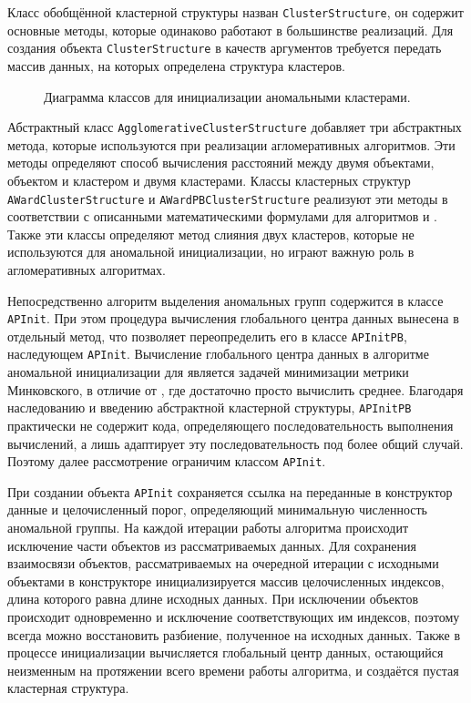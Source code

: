 \documentclass[12pt]{diploma}
\begin{document}
	Класс обобщённой кластерной структуры назван \texttt{ClusterStructure}, он содержит основные методы, которые одинаково работают в большинстве реализаций. Для создания объекта \texttt{ClusterStructure} в качеств аргументов требуется передать массив данных, на которых определена структура кластеров.
	
	\begin{figure}[h!]
		\centering
		
		\caption{Диаграмма классов для инициализации аномальными кластерами.}
		\label{fig:ap-init-classes}
	\end{figure}
	
	Абстрактный класс \texttt{AgglomerativeClusterStructure} добавляет три абстрактных метода, которые используются при реализации агломеративных алгоритмов. Эти методы определяют способ вычисления расстояний между двумя объектами, объектом и кластером и двумя кластерами.	Классы кластерных структур \texttt{AWardClusterStructure} и \texttt{AWardPBClusterStructure} реализуют эти методы в соответствии с описанными математическими формулами для алгоритмов \AWard и \AWardpb. Также эти классы определяют метод слияния двух кластеров, которые не используются для аномальной инициализации, но играют важную роль в агломеративных алгоритмах.
	
	Непосредственно алгоритм выделения аномальных групп содержится в классе \texttt{APInit}. При этом процедура вычисления глобального центра данных вынесена в отдельный метод, что позволяет переопределить его в классе \texttt{APInitPB}, наследующем \texttt{APInit}. Вычисление глобального центра данных в алгоритме аномальной инициализации для \AWardpb является задачей минимизации метрики Минковского, в отличие от  \AWard, где достаточно просто вычислить среднее. Благодаря наследованию и введению абстрактной кластерной структуры, \texttt{APInitPB} практически не содержит кода, определяющего последовательность выполнения вычислений, а лишь адаптирует эту последовательность под более общий случай. Поэтому далее рассмотрение ограничим классом \texttt{APInit}.
	
	При создании объекта \texttt{APInit} сохраняется ссылка на переданные в конструктор данные и целочисленный порог, определяющий минимальную численность аномальной группы. На каждой итерации работы алгоритма происходит исключение части объектов из рассматриваемых данных. Для сохранения взаимосвязи объектов, рассматриваемых на очередной итерации с исходными объектами в конструкторе инициализируется массив целочисленных индексов, длина которого равна длине исходных данных. При исключении объектов происходит одновременно и исключение соответствующих им индексов, поэтому всегда можно восстановить разбиение, полученное на исходных данных. Также в процессе инициализации вычисляется глобальный центр данных, остающийся неизменным на протяжении всего времени работы алгоритма, и создаётся пустая кластерная структура.
		
\end{document}
